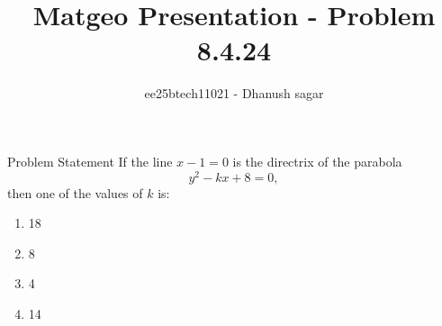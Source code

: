 \documentclass{beamer}
\title{Matgeo Presentation - Problem 8.4.24}
\author{ee25btech11021 - Dhanush sagar}
\numberwithin{equation}{section}
\theoremstyle{remark}
\begin{document}
	

		




\begin{frame}
  \titlepage
\end{frame}

\begin{frame}{Problem Statement}
If the line $x - 1 = 0$ is the directrix of the parabola 
\[
y^2 - kx + 8 = 0,
\] 
then one of the values of $k$ is:
\begin{multicols}{4}
    \begin{enumerate}
    \item 18
    \item 8
    \item 4
    \item 14
\end{enumerate}
\end{multicols}
\end{frame}
\end{document}
